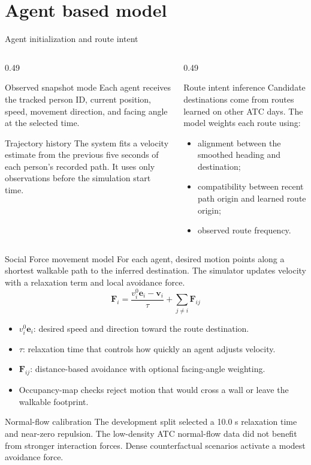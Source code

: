 \documentclass[aspectratio=169]{beamer}
\begin{document}
\section{Agent based model}
\begin{frame}{Agent initialization and route intent}
\begin{columns}[T]
\begin{column}{0.49\textwidth}
\begin{block}{Observed snapshot mode}
Each agent receives the tracked person ID, current position, speed, movement direction, and facing angle at the selected time.
\end{block}
\begin{block}{Trajectory history}
The system fits a velocity estimate from the previous five seconds of each person's recorded path. It uses only observations before the simulation start time.
\end{block}
\end{column}
\begin{column}{0.49\textwidth}
\begin{block}{Route intent inference}
Candidate destinations come from routes learned on other ATC days. The model weights each route using:
\begin{itemize}
\item alignment between the smoothed heading and destination;
\item compatibility between recent path origin and learned route origin;
\item observed route frequency.
\end{itemize}
\end{block}
\end{column}
\end{columns}
\end{frame}

\begin{frame}{Social Force movement model}
\small
For each agent, desired motion points along a shortest walkable path to the inferred destination. The simulator updates velocity with a relaxation term and local avoidance force.
\[
\mathbf{F}_i = \frac{v_i^0\mathbf{e}_i-\mathbf{v}_i}{\tau} + \sum_{j\ne i}\mathbf{F}_{ij}
\]
\begin{itemize}
  \item $v_i^0\mathbf{e}_i$: desired speed and direction toward the route destination.
  \item $\tau$: relaxation time that controls how quickly an agent adjusts velocity.
  \item $\mathbf{F}_{ij}$: distance-based avoidance with optional facing-angle weighting.
  \item Occupancy-map checks reject motion that would cross a wall or leave the walkable footprint.
\end{itemize}
\begin{block}{Normal-flow calibration}
The development split selected a 10.0 s relaxation time and near-zero repulsion. The low-density ATC normal-flow data did not benefit from stronger interaction forces. Dense counterfactual scenarios activate a modest avoidance force.
\end{block}
\end{frame}
\end{document}
